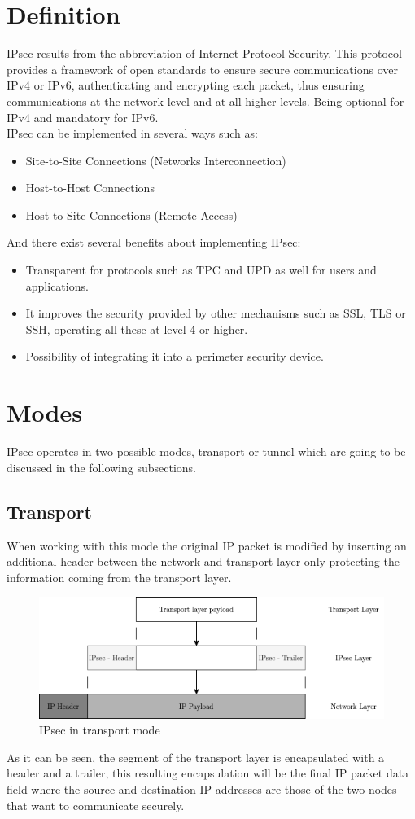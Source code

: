 \documentclass[11pt]{book}
\begin{document}
\section{Definition}
IPsec results from the abbreviation of Internet Protocol Security. This protocol provides a framework of open standards to ensure secure communications over IPv4 or IPv6, authenticating and encrypting each packet, thus ensuring communications at the network level and at all higher levels. Being optional for IPv4 and mandatory for IPv6.\\
IPsec can be implemented in several ways such as:
\begin{itemize}
\item Site-to-Site Connections (Networks Interconnection)
\item Host-to-Host Connections
\item Host-to-Site Connections (Remote Access)
\end{itemize}
And there exist several benefits about implementing IPsec:
\begin{itemize}
\item Transparent for protocols such as TPC and UPD as well for users and applications.
\item It improves the security provided by other mechanisms such as SSL, TLS or SSH, operating all these at level 4 or higher.
\item Possibility of integrating it into a perimeter security device.
\end{itemize}

\break

\section{Modes}
IPsec operates in two possible modes, transport or tunnel which are going to be discussed in the following subsections.
\subsection{Transport}
When working with this mode the original IP packet is modified by inserting an additional header between the network and transport layer only protecting the information coming from the transport layer. 
\begin{figure}[H]
	\centering
	\includegraphics [scale=0.5] {transport_encapsulation.png}
	\caption{IPsec in transport mode}
\end{figure}
As it can be seen, the segment of the transport layer is encapsulated with a header and a trailer, this resulting encapsulation will be the final IP packet data field where the source and destination IP addresses are those of the two nodes that want to communicate securely.\\
\end{document}
